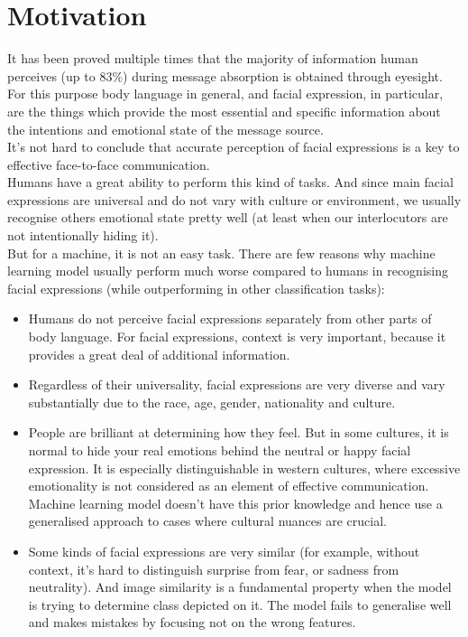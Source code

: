 \section{Motivation}

It has been proved multiple times that the majority of information human perceives (up to $83\%$) during message absorption is obtained through eyesight. For this purpose body language in general, and facial expression, in particular, are the things which provide the most essential and specific information about the intentions and emotional state of the message source.\\

It's not hard to conclude that accurate perception of facial expressions is a key to effective face-to-face communication.\\

Humans have a great ability to perform this kind of tasks. And since main facial expressions are universal and do not vary with culture or environment, we usually recognise others emotional state pretty well (at least when our interlocutors are not intentionally hiding it).\\

But for a machine, it is not an easy task. There are few reasons why machine learning model usually perform much worse compared to humans in recognising facial expressions (while outperforming in other classification tasks):
\begin{itemize}
    \item 
    Humans do not perceive facial expressions separately from other parts of body language. For facial expressions, context is very important, because it provides a great deal of additional information.
    \item
    Regardless of their universality, facial expressions are very diverse and vary substantially due to the race, age, gender, nationality and culture.
    \item 
    People are brilliant at determining how they feel. But in some cultures, it is normal to hide your real emotions behind the neutral or happy facial expression. It is especially distinguishable in western cultures, where excessive emotionality is not considered as an element of effective communication. Machine learning model doesn't have this prior knowledge and hence use a generalised approach to cases where cultural nuances are crucial.
    \item 
    Some kinds of facial expressions are very similar (for example, without context, it's hard to distinguish surprise from fear, or sadness from neutrality). And image similarity is a fundamental property when the model is trying to determine class depicted on it. The model fails to generalise well and makes mistakes by focusing not on the wrong features.
\end{itemize}

